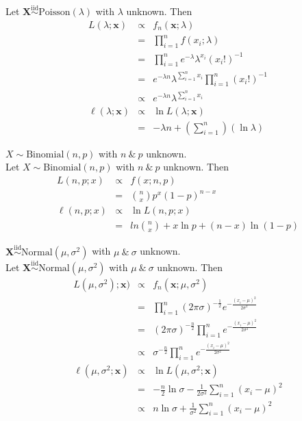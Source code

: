 \documentclass[11pt,a4paper]{article}
\begin{document}
\apart
Let $\textbf{X}\overset{\mathrm{iid}}{\sim}\mathrm{Poisson}(\lambda)$ with $\lambda$ unknown. Then
\[\begin{array}{rcl}
L(\lambda;\textbf{x})&\propto&f_n(\textbf{x};\lambda)\\
&=&\prod\limits_{i=1}^nf(x_i;\lambda)\\
&=&\prod\limits_{i=1}^ne^{-\lambda}\lambda^{x_i}(x_i!)^{-1}\\
&=& e^{-\lambda n}\lambda^{\sum_{i=1}^n x_i}\prod\limits_{i=1}^n(x_i!)^{-1}\\
&\propto&e^{-\lambda n}\lambda^{\sum_{i=1}^n x_i}\\
\ell(\lambda;\textbf{x})&\propto&\ln L(\lambda;\textbf{x})\\
&=&-\lambda n+\left(\sum\limits_{i=1}^n\right)(\ln\lambda)
\end{array}\]

\qpartnb $X\sim\mathrm{Binomial}(n,p)$ with $n\ \&\ p$ unknown.\\

\apart
Let $X\sim\mathrm{Binomial}(n,p)$ with $n\ \&\ p$ unknown. Then
\[\begin{array}{rcl}
L(n,p;x)&\propto&f(x;n,p)\\
&=&{n \choose x}p^x(1-p)^{n-x}\\
\ell(n,p;x)&\propto&\ln L(n,p;x)\\
&=&ln{n \choose x} + x\ln p + (n-x)\ln(1-p)
\end{array}\]

\newpage
\qpartnb $\textbf{X}\overset{\mathrm{iid}}{\sim}\mathrm{Normal}(\mu,\sigma^2)$ with $\mu\ \&\ \sigma$ unknown.\\

\apart
Let $\textbf{X}\overset{\mathrm{iid}}{\sim}\mathrm{Normal}(\mu,\sigma^2)$ with $\mu\ \&\ \sigma$ unknown. Then
\[\begin{array}{rcl}
L(\mu,\sigma^2);\textbf{x})&\propto&f_n(\textbf{x};\mu,\sigma^2)\\
&=&\prod\limits_{i=1}^n (2\pi\sigma)^{-\frac{1}{2}} e^{-\frac{(x_i-\mu)^2}{2\sigma^2}}\\
&=&(2\pi\sigma)^{-\frac{n}{2}}\prod\limits_{i=1}^n e^{-\frac{(x_i-\mu)^2}{2\sigma^2}}\\
&\propto&\sigma^{-\frac{n}{2}}\prod\limits_{i=1}^n e^{-\frac{(x_i-\mu)^2}{2\sigma^2}}\\
\ell(\mu,\sigma^2;\textbf{x})&\propto&\ln L(\mu,\sigma^2;\textbf{x})\\
&=&-\frac{n}{2}\ln\sigma -\frac{1}{2\sigma^2}\sum\limits_{i=1}^n(x_i-\mu)^2\\
&\propto&n\ln\sigma +\frac{1}{\sigma^2}\sum\limits_{i=1}^n(x_i-\mu)^2
\end{array}\]
\end{document}
